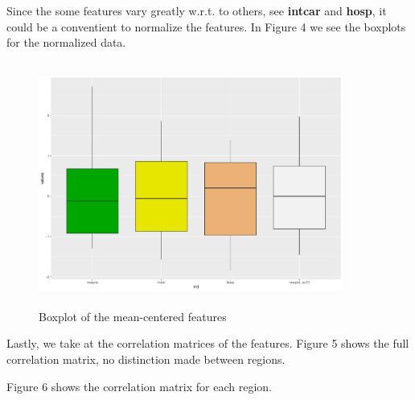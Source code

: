 \documentclass[12pt,a4paper]{article}
\theoremstyle{definition}
\theoremstyle{remark}
\begin{document}
    Since the some features vary greatly w.r.t. to others, see \textbf{intcar} and \textbf{hosp}, it could be a conventient to normalize the features.  In Figure 4 we see the boxplots for the normalized data.
    
    
     	\begin{figure}[htb!]
    	\centering
    	\includegraphics[width=100mm, height=80mm,scale=0.5]{boxplot2.pdf}
    	\caption{Boxplot of the mean-centered features}
    \end{figure}
    

Lastly, we take at the correlation matrices of the features. Figure 5 shows the full correlation matrix, no distinction made between regions. 

Figure 6 shows the correlation matrix for each region.
    
\end{document}
